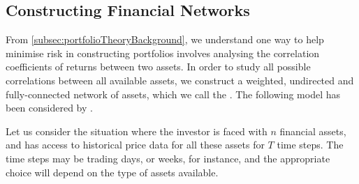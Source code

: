 \subsection{Constructing Financial Networks}
\label{subsec:financialNetworksConstructionBackground}

From \cref{subsec:portfolioTheoryBackground}, we understand one way to help minimise risk in constructing portfolios involves analysing the correlation coefficients of returns between two assets.
In order to study all possible correlations between all available assets, we construct a weighted, undirected and fully-connected network of assets, which we call the . The following model has been considered by \cite{PGR+99,OCK+02,OKK03,FPM+10,MG13}.

Let us consider the situation where the investor is faced with $n$ financial assets, and has access to historical price data for all these assets for $T$ time steps.
The time steps may be trading days, or weeks, for instance, and the appropriate choice will depend on the type of assets available.

